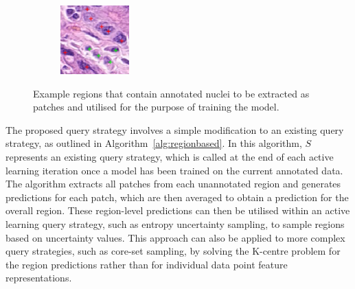 \begin{figure}[h]
\begin{subfigure}{0.3\textwidth}
	\end{subfigure}
	\begin{subfigure}{0.3\textwidth}
		\includegraphics[width=\linewidth]{images/nuclei_example_3.png}
	\end{subfigure}
	\caption{Example regions that contain annotated nuclei to be extracted as patches and utilised for the purpose of training the model.}
	\label{fig:nuclei_example}
\end{figure}

The proposed query strategy involves a simple modification to an existing query strategy, as outlined in Algorithm~\ref{alg:regionbased}. In this algorithm, $S$ represents an existing query strategy, which is called at the end of each active learning iteration once a model has been trained on the current annotated data. The algorithm extracts all patches from each unannotated region and generates predictions for each patch, which are then averaged to obtain a prediction for the overall region. These region-level predictions can then be utilised within an active learning query strategy, such as entropy uncertainty sampling, to sample regions based on uncertainty values. This approach can also be applied to more complex query strategies, such as core-set sampling, by solving the K-centre problem for the region predictions rather than for individual data point feature representations.

